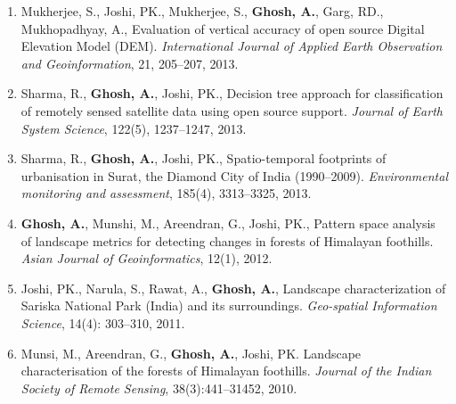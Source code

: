 \documentclass[11pt]{article}
\makeatletter
\newlength{\bibhang}
\newlength{\bibsep}
 {\@listi \global\bibsep\itemsep \global\advance\bibsep by\parsep}
\newenvironment{bibsection}%
        {\begin{enumerate}{}{%
       \setlength{\leftmargin}{\bibhang}%
       \setlength{\itemindent}{-\leftmargin}%
       \setlength{\itemsep}{\bibsep}%
       \setlength{\parsep}{\z@}%
        \setlength{\partopsep}{0pt}%
        \setlength{\topsep}{0pt}}}
        {\end{enumerate}\vspace{-.6\baselineskip}}
\makeatother
\begin{document}
\begin{bibsection}
    \item Mukherjee, S., Joshi, PK., Mukherjee, S., {\bf Ghosh, A.}, Garg, RD., Mukhopadhyay, A., Evaluation of vertical accuracy of open source Digital Elevation Model (DEM). \emph {International Journal of Applied Earth Observation and Geoinformation}, 21, 205--207, 2013.
    \item Sharma, R., {\bf Ghosh, A.}, Joshi, PK., Decision tree approach for classification of remotely sensed satellite data using open source support. \emph{Journal of Earth System Science}, 122(5), 1237--1247, 2013.
    \item Sharma, R., {\bf Ghosh, A.}, Joshi, PK., Spatio-temporal footprints of urbanisation in Surat, the Diamond City of India (1990--2009). \emph {Environmental monitoring and assessment}, 185(4), 3313--3325, 2013.
    \item {\bf Ghosh, A.}, Munshi, M., Areendran, G., Joshi, PK., Pattern space analysis of landscape metrics for detecting changes in forests of Himalayan foothills. \emph{Asian Journal of Geoinformatics}, 12(1), 2012.
    \item Joshi, PK., Narula, S., Rawat, A., {\bf Ghosh, A.}, Landscape characterization of Sariska National Park (India) and its surroundings. \emph{Geo-spatial Information Science}, 14(4): 303--310, 2011.
    \item Munsi, M., Areendran, G., {\bf Ghosh, A.}, Joshi, PK.  Landscape characterisation of the forests of Himalayan foothills. \emph{Journal of the Indian Society of Remote Sensing}, 38(3):441--31452, 2010.

\end{bibsection}
\end{document}
